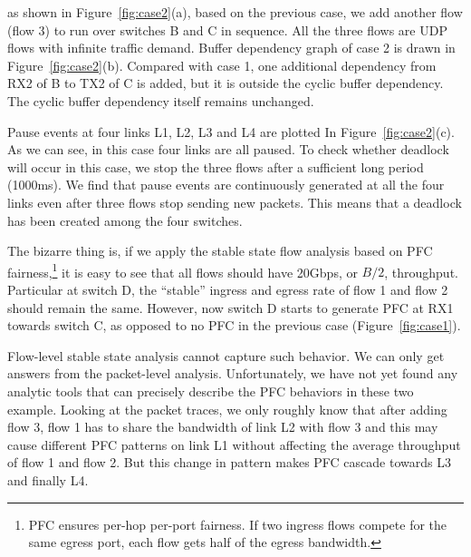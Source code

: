  as shown in Figure~\ref{fig:case2}(a), based on the previous case, we 
add another flow (flow 3) to run over switches B and C in sequence. All the three flows are UDP 
flows with infinite traffic demand. Buffer dependency graph of case 2 is drawn in Figure~\ref{fig:case2}(b). 
Compared with case 1, one additional dependency from RX2 of B to TX2 of C is added, but it
is outside the cyclic buffer dependency. The cyclic buffer dependency itself remains unchanged.

Pause events at four links L1, L2, L3 and L4 are plotted In Figure~\ref{fig:case2}(c). As we can see, in 
this case four links are all paused. To check whether deadlock will occur in this case, we stop the three 
flows after a sufficient long period (1000ms). We find that pause events are continuously 
generated at all the four links even after three flows stop sending new packets. 
This means that a deadlock has been created among the four switches.

The bizarre thing is, if we apply the stable state flow analysis based on PFC fairness,\footnote{PFC
ensures per-hop per-port fairness. If two ingress flows compete for the same egress port, each flow gets
half of the egress bandwidth.} it is easy to see that all flows should have 20Gbps, or $B/2$, throughput.
Particular at switch D, the ``stable'' ingress and egress rate of flow 1 and flow 2 should remain the same.
However, now switch D starts to generate PFC at RX1 towards switch C, as opposed to no PFC in the previous
case (Figure~\ref{fig:case1}). 


Flow-level stable state analysis cannot capture such behavior. We can only get answers from the 
packet-level analysis. Unfortunately, we have not yet found any analytic tools that can precisely
describe the PFC behaviors in these two example. Looking at the packet traces, we only roughly know that 
after adding flow 3, flow 1 has to share the bandwidth of link L2 with flow 3 and this may cause
different PFC patterns on link L1 without affecting the average throughput of flow 1 and flow 2.
But this change in pattern makes PFC cascade towards L3 and finally L4.


